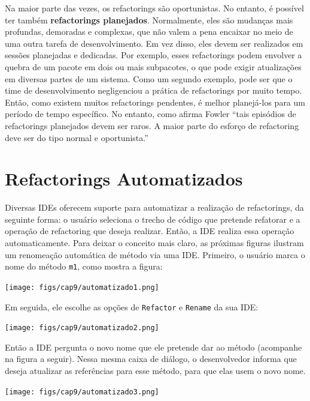 \documentclass[
  11pt,
  twoside]{book}
\newcommand{\passthrough}[1]{#1}
\begin{document}
  Na maior parte das
vezes, os refactorings são oportunistas. No entanto, é possível ter
também \textbf{refactorings planejados}. Normalmente, eles são mudanças
mais profundas, demoradas e complexas, que não valem a pena encaixar no
meio de uma outra tarefa de desenvolvimento. Em vez disso, eles devem
ser realizados em sessões planejadas e dedicadas. Por exemplo, esses
refactorings podem envolver a quebra de um pacote em dois ou mais
subpacotes, o que pode exigir atualizações em diversas partes de um
sistema. Como um segundo exemplo, pode ser que o time de desenvolvimento
negligenciou a prática de refactorings por muito tempo. Então, como
existem muitos refactorings pendentes, é melhor planejá-los para um
período de tempo específico. No entanto, como afirma Fowler ``tais
episódios de refactorings planejados devem ser raros. A maior parte do
esforço de refactoring deve ser do tipo normal e oportunista.''

\hypertarget{refactorings-automatizados}{%
\section{Refactorings Automatizados}\label{refactorings-automatizados}}


Diversas IDEs oferecem suporte para automatizar a realização de
refactorings, da seguinte forma: o usuário seleciona o trecho de código
que pretende refatorar e a operação de refactoring que deseja realizar.
Então, a IDE realiza essa operação automaticamente. Para deixar o
conceito mais claro, as próximas figuras ilustram um renomeação
automática de método via uma IDE. Primeiro, o usuário marca o nome do
método \passthrough{\lstinline!m1!}, como mostra a figura:

\texttt{[image: figs/cap9/automatizado1.png]}

Em seguida, ele escolhe as opções de \passthrough{\lstinline!Refactor!}
e \passthrough{\lstinline!Rename!} da sua IDE:

\texttt{[image: figs/cap9/automatizado2.png]}

Então a IDE pergunta o novo nome que ele pretende dar ao método
(acompanhe na figura a seguir). Nessa mesma caixa de diálogo, o
desenvolvedor informa que deseja atualizar as referências para esse
método, para que elas usem o novo nome.

\texttt{[image: figs/cap9/automatizado3.png]}
\end{document}
